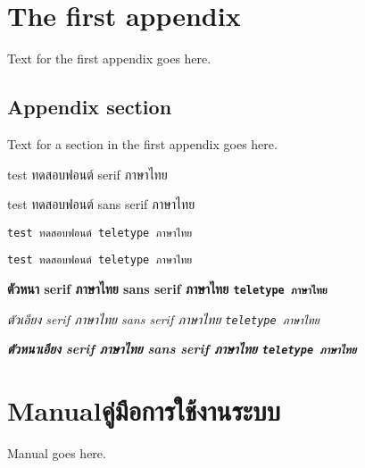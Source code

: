 \chapter{The first appendix}

Text for the first appendix goes here.

\section{Appendix section}

Text for a section in the first appendix goes here.

test ทดสอบฟอนต์ serif ภาษาไทย

\textsf{test ทดสอบฟอนต์ sans serif ภาษาไทย}

\verb+test ทดสอบฟอนต์ teletype ภาษาไทย+

\texttt{test ทดสอบฟอนต์ teletype ภาษาไทย}

\textbf{ตัวหนา serif ภาษาไทย \textsf{sans serif ภาษาไทย} \texttt{teletype ภาษาไทย}}

\textit{ตัวเอียง serif ภาษาไทย \textsf{sans serif ภาษาไทย} \texttt{teletype ภาษาไทย}}

\textbf{\textit{ตัวหนาเอียง serif ภาษาไทย \textsf{sans serif ภาษาไทย} \texttt{teletype ภาษาไทย}}}

\chapter{\ifenglish Manual\else คู่มือการใช้งานระบบ\fi}

Manual goes here.
